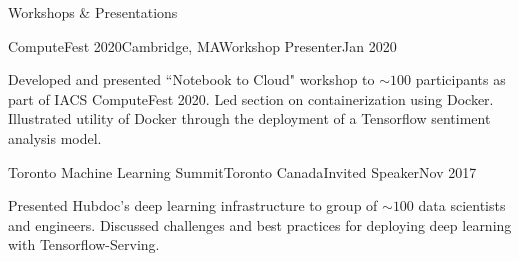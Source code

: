 \documentclass{resume} %
\begin{document}
\begin{rSection}{Workshops \& Presentations}

\begin{rSubsection}{ComputeFest 2020}{Cambridge, MA}{Workshop Presenter}{Jan 2020}

\item Developed and presented ``Notebook to Cloud" workshop to $\sim 100$ participants as part of IACS ComputeFest 2020. Led section on containerization using Docker. Illustrated utility of Docker through the deployment of a Tensorflow sentiment analysis model.

\end{rSubsection}

\begin{rSubsection}{Toronto Machine Learning Summit}{Toronto Canada}{Invited Speaker}{Nov 2017}

\item Presented Hubdoc's deep learning infrastructure to group of $\sim 100$ data scientists and engineers. Discussed challenges and best practices for deploying deep learning with Tensorflow-Serving. 

\end{rSubsection}

\end{rSection}
\end{document}
